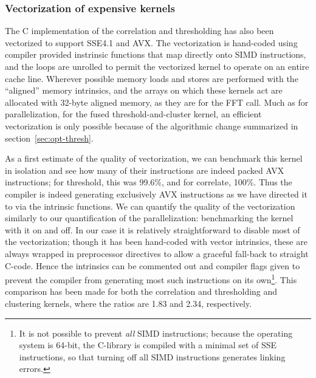 \vspace*{-10pt}
\subsubsection{Vectorization of expensive kernels}
\vspace*{-05pt}
\label{sec:vect-expens-kern}

The C implementation of the correlation and thresholding has also been vectorized to
support SSE4.1 and AVX. 
The vectorization is hand-coded using compiler
provided instrinsic functions that map directly onto SIMD instructions, and the
loops are unrolled to permit the vectorized kernel to operate on an entire cache
line. Wherever possible memory loads and stores are performed with the
``aligned'' memory intrinsics, and the arrays on which these kernels act are
allocated with 32-byte aligned memory, as they are for the FFT call. Much as for
parallelization, for the fused threshold-and-cluster kernel, an efficient
vectorization is only possible because of the algorithmic change summarized in
section~\ref{sec:opt-thresh}. 

As a first estimate of the quality of vectorization, we can benchmark this
kernel in isolation and see how many of their instructions are indeed packed
AVX instructions; for threshold, this was 99.6\%, and for correlate, 100\%. Thus
the compiler is indeed generating exclusively AVX instructions as we have
directed it to via the intrinsic functions.
We can quantify the quality of the vectorization similarly to our
quantification of the parallelization: benchmarking the kernel with it on and
off. In our case it is relatively straightforward to disable most of the
vectorization; though it has been hand-coded with vector intrinsics, these are
always wrapped in preprocessor directives to allow a graceful fall-back to
straight C-code.  Hence the intrinsics can be commented out and compiler flags
given to prevent the compiler from generating most such instructions on its
own\footnote{It is not possible to prevent \emph{all} SIMD instructions; because
  the operating system is 64-bit, the C-library is compiled with a minimal set
  of SSE instructions, so that turning off all SIMD instructions generates linking
  errors.}.
This comparison has been made for both the correlation and thresholding and
clustering kernels, where the ratios are 1.83 and 2.34, respectively. 

